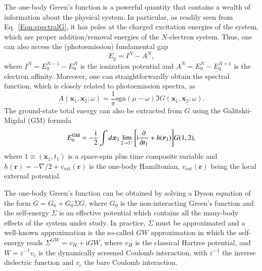 \documentclass[aps,prb,reprint,superscriptaddress]{revtex4-1}
\newcommand{\br}{\boldsymbol{r}}
\newcommand{\bx}{\boldsymbol{x}}
\newcommand{\dbx}{d\bx}
\newcommand{\Nel}{N}
\newcommand{\veps}{\varepsilon}
\newcommand{\Eg}{E_\text{g}}
\newcommand{\I}{\text{i}}
\begin{document}
The one-body Green's function is a powerful quantity that contains a wealth of information about the physical system. In particular, as readily seen from Eq.~\eqref{Eqn:spectralG}, it has poles at the charged excitation energies of the system, which are proper addition/removal energies of the $\Nel$-electron system. Thus, one can also access the (photoemission) fundamental gap
\begin{equation}
\label{Eqn:EgFun}
	\Eg = I^{\Nel} - A^{\Nel},
\end{equation}
where $I^{\Nel} = E_0^{\Nel-1} - E_0^{\Nel}$ is the ionization potential and $A^{\Nel} = E_0^{\Nel} - E_0^{\Nel+1}$ is the electron affinity.
Moreover, one can straightforwardly obtain the spectral function, which is closely related to photoemission spectra, as
\begin{equation}
\label{Eqn:spectral_functions}
    A(\bx_1,\bx_2; \omega)=\frac{1}{\pi}\text{sgn}(\mu-\omega)\Im G(\bx_1,\bx_2;\omega).
\end{equation}
The ground-state total energy can also be extracted from $G$ using the Galitskii-Migdal (GM) formula \citep{Galitskii_1958}
\begin{equation}
\label{Eqn:GM}
	E_0^\text{GM} = - \frac{\I}{2}\int \dbx_1 \lim_{2 \to 1^+}\qty[ \I \pdv{}{t_1} + h(\br_1) ] G(1,2),
\end{equation}
where $1 \equiv (\bx_1,t_1)$ is a space-spin plus time composite variable and $h(\br{})=-\nabla/2+v_\text{ext}(\br{})$ is the one-body Hamiltonian, $v_\text{ext}(\br{})$ being the local external potential. 

The one-body Green's function can be obtained by solving a Dyson equation of the form $G=G_0+G_0\Sigma G$, where $G_0$ is the non-interacting Green's function and the self-energy $\Sigma$ is an effective potential which contains all the many-body effects of the system under study. In practice, $\Sigma$ must be approximated and a well-known approximation is the so-called $GW$ approximation in which the self-energy reads $\Sigma^{GW}=v_H + \I GW$, where $v_H$ is the classical Hartree potential, and $W=\veps^{-1}v_c$ is the dynamically screened Coulomb interaction, with $\veps^{-1}$ the inverse dielectric function and $v_c$ the bare Coulomb interaction. \citep{Hedin_1965}
\end{document}
